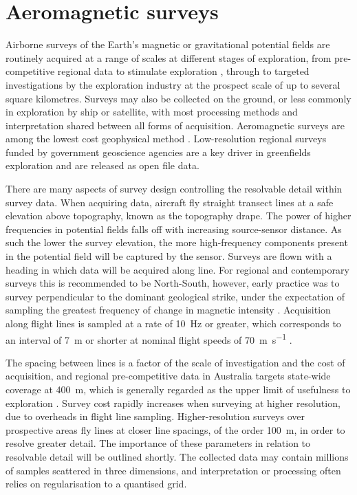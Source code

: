\section{Aeromagnetic surveys}
\label{sec:introgeo}
Airborne surveys of the Earth's magnetic or gravitational potential fields are routinely acquired at a range of scales at different stages of exploration, from pre-competitive regional data to stimulate exploration \parencite{howardAirborneGeophysicalCoverage2004}, through to targeted investigations by the exploration industry at the prospect scale of up to several square kilometres.
Surveys may also be collected on the ground, or less commonly in exploration by ship or satellite, with most processing methods and interpretation shared between all forms of acquisition.
Aeromagnetic surveys are among the lowest cost geophysical method \parencite{dentithGeophysicsMineralExploration2014}.
Low-resolution regional surveys funded by government geoscience agencies are a key driver in greenfields exploration and are released as open file data.

There are many aspects of survey design controlling the resolvable detail within survey data.
When acquiring data, aircraft fly straight transect lines at a safe elevation above topography, known as the topography drape.
The power of higher frequencies in potential fields falls off with increasing source-sensor distance.
As such the lower the survey elevation, the more high-frequency components present in the potential field will be captured by the sensor.
Surveys are flown with a heading in which data will be acquired along line.
For regional and contemporary surveys this is recommended to be North-South, however, early practice was to survey perpendicular to the dominant geological strike, under the expectation of sampling the greatest frequency of change in magnetic intensity \parencite{islesGeologicalInterpretationAeromagnetic2013}.
Acquisition along flight lines is sampled at a rate of \qty{10}{\hertz} or greater, which corresponds to an interval of \qty{7}{\m} or shorter at nominal flight speeds of \qty{70}{\m\per\s} \parencite{goodwinAirborneMagneticRadiometric2023}.

The spacing between lines is a factor of the scale of investigation and the cost of acquisition, and regional pre-competitive data in Australia targets state-wide coverage at \qty{400}{\m}, which is generally regarded as the upper limit of usefulness to exploration \parencite{howardAirborneGeophysicalCoverage2004}.
Survey cost rapidly increases when surveying at higher resolution, due to overheads in flight line sampling.
Higher-resolution surveys over prospective areas fly lines at closer line spacings, of the order \qty{100}{\m}, in order to resolve greater detail.
The importance of these parameters in relation to resolvable detail will be outlined shortly.
The collected data may contain millions of samples scattered in three dimensions, and interpretation or processing often relies on regularisation to a quantised grid.

